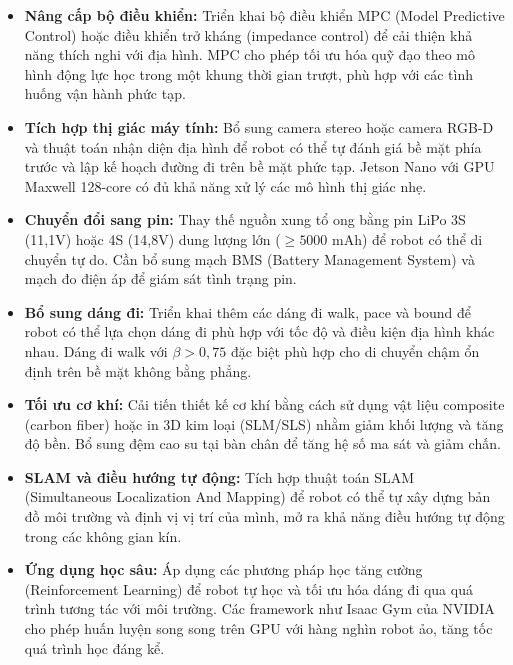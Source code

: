 \begin{itemize}
    \item \textbf{Nâng cấp bộ điều khiển:} Triển khai bộ điều khiển MPC (Model Predictive Control) hoặc điều khiển trở kháng (impedance control) để cải thiện khả năng thích nghi với địa hình. MPC cho phép tối ưu hóa quỹ đạo theo mô hình động lực học trong một khung thời gian trượt, phù hợp với các tình huống vận hành phức tạp.

    \item \textbf{Tích hợp thị giác máy tính:} Bổ sung camera stereo hoặc camera RGB-D và thuật toán nhận diện địa hình để robot có thể tự đánh giá bề mặt phía trước và lập kế hoạch đường đi trên bề mặt phức tạp. Jetson Nano với GPU Maxwell 128-core có đủ khả năng xử lý các mô hình thị giác nhẹ.

    \item \textbf{Chuyển đổi sang pin:} Thay thế nguồn xung tổ ong bằng pin LiPo 3S (11,1V) hoặc 4S (14,8V) dung lượng lớn ($\geq 5000$ mAh) để robot có thể di chuyển tự do. Cần bổ sung mạch BMS (Battery Management System) và mạch đo điện áp để giám sát tình trạng pin.

    \item \textbf{Bổ sung dáng đi:} Triển khai thêm các dáng đi walk, pace và bound để robot có thể lựa chọn dáng đi phù hợp với tốc độ và điều kiện địa hình khác nhau. Dáng đi walk với $\beta > 0{,}75$ đặc biệt phù hợp cho di chuyển chậm ổn định trên bề mặt không bằng phẳng.

    \item \textbf{Tối ưu cơ khí:} Cải tiến thiết kế cơ khí bằng cách sử dụng vật liệu composite (carbon fiber) hoặc in 3D kim loại (SLM/SLS) nhằm giảm khối lượng và tăng độ bền. Bổ sung đệm cao su tại bàn chân để tăng hệ số ma sát và giảm chấn.

    \item \textbf{SLAM và điều hướng tự động:} Tích hợp thuật toán SLAM (Simultaneous Localization And Mapping) để robot có thể tự xây dựng bản đồ môi trường và định vị vị trí của mình, mở ra khả năng điều hướng tự động trong các không gian kín.

    \item \textbf{Ứng dụng học sâu:} Áp dụng các phương pháp học tăng cường (Reinforcement Learning) để robot tự học và tối ưu hóa dáng đi qua quá trình tương tác với môi trường. Các framework như Isaac Gym của NVIDIA cho phép huấn luyện song song trên GPU với hàng nghìn robot ảo, tăng tốc quá trình học đáng kể.


\end{itemize}
